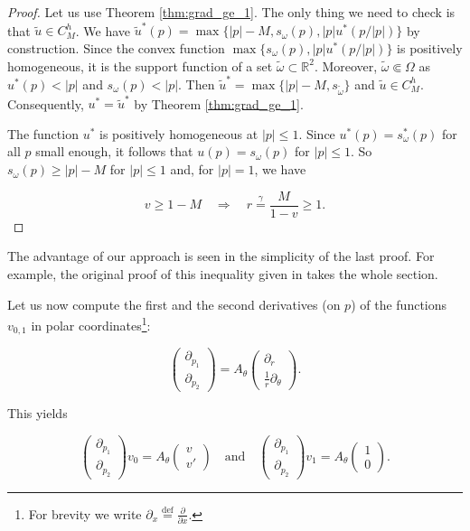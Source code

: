\documentclass[14pt]{extarticle}
\renewcommand{\le}{\leqslant}
\renewcommand{\ge}{\geqslant}
\newcommand{\R}{\mathbb{R}}
\newcommand{\eqdef}{\stackrel{\mathrm{def}}{=}}
\theoremstyle{remark}
\theoremstyle{definition}
\begin{document}
\begin{proof}
	Let us use Theorem \ref{thm:grad_ge_1}. The only thing we need to check is that $\tilde u\in C_M^h$. We have $\tilde u^*(p)=\max\{|p|-M,s_\omega(p),|p|u^*(p/|p|)\}$ by construction. Since the convex function $\max\{s_\omega(p),|p|u^*(p/|p|)\}$ is positively homogeneous, it is the support function of a set $\tilde\omega\subset \R^2$. Moreover, $\tilde\omega\Subset\Omega$ as $u^*(p)<|p|$ and $s_\omega(p)<|p|$. Then $\tilde u^* = \max\{|p|-M,s_{\tilde\omega}\}$ and $\tilde u\in C_M^h$. Consequently, $u^*=\tilde u^*$ by Theorem \ref{thm:grad_ge_1}.
	
	The function $u^*$ is positively homogeneous at $|p|\le 1$. Since $u^*(p)=s_\omega^*(p)$ for all $p$ small enough, it follows that $u(p)=s_\omega(p)$ for $|p|\le 1$. So $s_\omega(p)\ge |p|-M$ for $|p|\le 1$ and, for $|p|=1$, we have

	\[
		v\ge 1-M
		\quad\Rightarrow\quad
		r\stackrel{\gamma}{=}\frac{M}{1-v}\ge 1.
	\]

\end{proof}

The advantage of our approach is seen in the simplicity of the last proof. For example, the original proof of this inequality given in \cite{LachandPolygon} takes the whole section.

Let us now compute the first and the second derivatives (on $p$) of the functions $v_{0,1}$ in polar coordinates\footnote{For brevity we write $\partial_{x}\eqdef\frac{\partial}{\partial x}$.}:

\[
	\left(\begin{array}{c}
		\partial_{p_1}\\
		\partial_{p_2}
	\end{array}\right)=
	A_\theta
	\left(\begin{array}{c}
		\partial_{r}\\
		\frac1r\partial_{\theta}
	\end{array}\right).
\]


\noindent This yields

\begin{equation}
\label{eq:heel_v_0_v_1_derivatives}
	\left(\begin{array}{c}
		\partial_{p_1}\\
		\partial_{p_2}
	\end{array}\right)v_0=
	A_\theta
	\left(\begin{array}{c}
		v\\v'
	\end{array}\right)
	\quad\mbox{and}\quad
	\left(\begin{array}{c}
		\partial_{p_1}\\
		\partial_{p_2}
	\end{array}\right)v_1=
	A_\theta
	\left(\begin{array}{c}
		1\\0
	\end{array}\right).
\end{equation}
\end{document}
